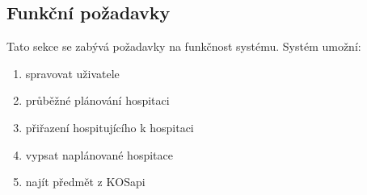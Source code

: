 \subsection{Funkční požadavky}
Tato sekce se zabývá požadavky na funkčnost systému. Systém umožní:
\begin{enumerate}
\item spravovat uživatele
\item průběžné plánování hospitaci
\item přiřazení hospitujícího k hospitaci
\item vypsat naplánované hospitace
\item najít předmět z KOSapi
\end{enumerate}